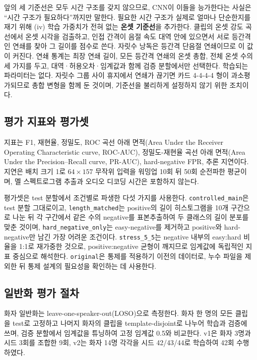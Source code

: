 \documentclass[11pt]{article}
\renewcommand{\emph}[1]{\textbf{#1}}
\begin{document}
앞의 세 기준선은 모두 시간 구조를 갖지 않으므로, CNN이 이들을 능가한다는 사실은 ``시간 구조가
필요하다''까지만 말한다. 필요한 시간 구조가 실제로 얼마나 단순한지를 재기 위해 (iv) 학습
가중치가 전혀 없는 \emph{온셋 기준선}을 추가한다. 클립의 온셋 강도 곡선에서 온셋 시각을
검출하고, 인접 간격이 음절 속도 대역 안에 있으면서 서로 등간격인 연쇄를 찾아 그 길이를 점수로
쓴다. 자릿수 낭독은 등간격 단음절 연쇄이므로 이 값이 커진다. 연쇄 통계는 최장 연쇄 길이, 모든
등간격 연쇄의 온셋 총합, 전체 온셋 수의 세 가지를 두고, 대역·허용오차·임계값과 함께 검증
분할에서만 선택한다. 학습되는 파라미터는 없다. 자릿수 그룹 사이 휴지에서 연쇄가 끊기면 카드
4-4-4-4 형이 과소평가되므로 총합 변형을 함께 둔 것이며, 기준선을 불리하게 설정하지 않기 위한
조치이다.

\subsection{평가 지표와 평가셋}
지표는 F1, 재현율, 정밀도, ROC 곡선 아래 면적(Area Under the Receiver Operating
Characteristic curve, ROC-AUC), 정밀도-재현율 곡선 아래 면적(Area Under the
Precision--Recall curve, PR-AUC), hard-negative FPR, 추론 지연이다. 지연은 배치 크기 1로
$64\times157$ 무작위 입력을 워밍업 10회 뒤 50회 순전파한 평균이며, 멜 스펙트로그램 추출과
오디오 디코딩 시간은 포함하지 않는다.

평가셋은 test 분할에서 조건별로 파생한 다섯 가지를 사용한다. \texttt{controlled\_main}은
test 분할 그대로이고, \texttt{length\_matched}는 positive의 길이 히스토그램을 10개 구간으로
나눈 뒤 각 구간에서 같은 수의 negative를 표본추출하여 두 클래스의 길이 분포를 맞춘 것이며,
\texttt{hard\_negative\_only}는 easy-negative를 제거하고 positive와 hard-negative만 남긴
가장 어려운 조건이다. \texttt{stress\_5\_5}는 negative 내부의 easy:hard 비율을 1:1로 재가중한
것으로, positive:negative 균형이 깨지므로 임계값에 독립적인 지표 중심으로 해석한다.
\texttt{original}은 통제를 적용하기 이전의 데이터로, 누수 파일을 제외한 뒤 통제 설계의
필요성을 확인하는 데 사용한다.

\subsection{일반화 평가 절차}
화자 일반화는 leave-one-speaker-out(LOSO)으로 측정한다. 화자 한 명의 모든 클립을 test로
고정하고 나머지 화자의 클립을 template-disjoint로 나누어 학습과 검증에 쓰며, 검증
분할에서 임계값을 튜닝하여 고정 임계값 0.5와 비교한다. v1은 화자 3명과 시드 3회를 조합한
9회, v2는 화자 14명 각각을 시드 42/43/44로 학습하여 42회 수행하였다.
\end{document}
